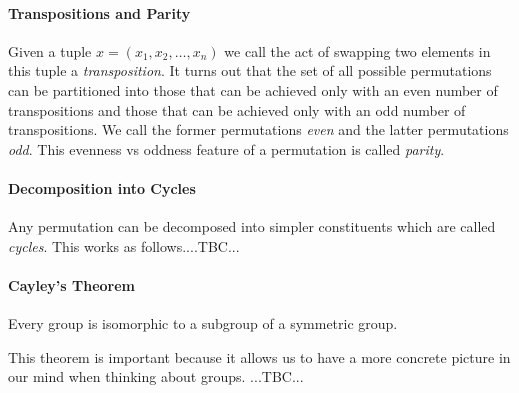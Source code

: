 \paragraph{Transpositions and Parity}
Given a tuple $x = (x_1, x_2, \ldots, x_n)$ we call the act of swapping two elements in this tuple a \emph{transposition}. It turns out that the set of all possible permutations can be partitioned into those that can be achieved only with an even number of transpositions and those that can be achieved only with an odd number of transpositions. We call the former permutations \emph{even} and the latter permutations \emph{odd}. This evenness vs oddness feature of a permutation is called \emph{parity}.


\paragraph{Decomposition into Cycles}
Any permutation can be decomposed into simpler constituents which are called \emph{cycles}. This works as follows....TBC...


\paragraph{Cayley's Theorem} Every group is isomorphic to a subgroup of a symmetric group.

\medskip
This theorem is important because it allows us to have a more concrete picture in our mind when thinking about groups. ...TBC...


